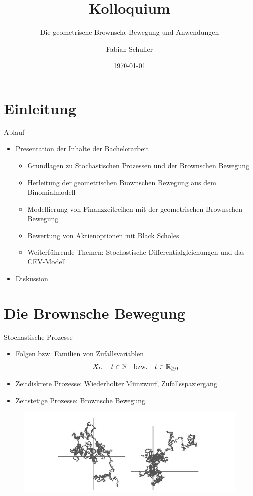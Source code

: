 \documentclass{beamer}
\title[Kolloquium]{Kolloquium}
\subtitle[Die geometrische Brownsche Bewegung und Anwendungen]{Die geometrische Brownsche Bewegung und Anwendungen}
\author{Fabian Schuller}
\date{\today}
\begin{document}
\section{Einleitung}

\begin{frame}
  \titlepage
\end{frame}

\begin{frame}{Ablauf}
  \begin{itemize}
    \item Presentation der Inhalte der Bachelorarbeit
    \begin{itemize}
      \item Grundlagen zu Stochastischen Prozessen und der Brownschen Bewegung
      \item Herleitung der geometrischen Brownschen Bewegung aus dem Binomialmodell
      \item Modellierung von Finanzzeitreihen mit der geometrischen Brownschen Bewegung
      \item Bewertung von Aktienoptionen mit Black Scholes
      \item Weiterführende Themen: Stochastische Differentialgleichungen und das CEV-Modell
    \end{itemize}
    \item Diskussion
  \end{itemize}
\end{frame}

\section{Die Brownsche Bewegung}

\begin{frame}{Stochastische Prozesse}
    \begin{itemize}
      \item Folgen bzw. Familien von Zufallsvariablen $$X_t,\quad t \in \Bbb N \quad \mathrm{ bzw. } \quad  t \in \Bbb R_{\ge 0}$$
      \item Zeitdiskrete Prozesse: Wiederholter Münzwurf, Zufallsspaziergang
      \item Zeitstetige Prozesse: Brownsche Bewegung
    \end{itemize}
    \begin{figure}
      \centering
      \includegraphics[width=1\textwidth]{images/bb_2d.png}
    \end{figure}
\end{frame}
\end{document}
